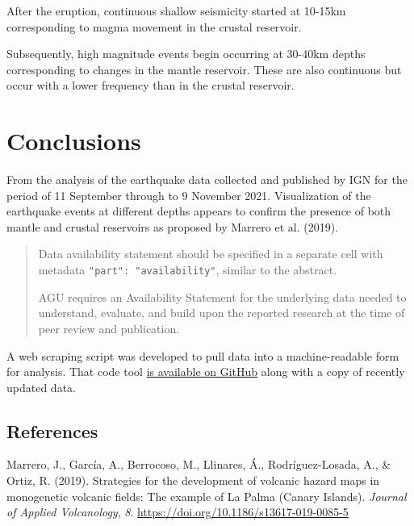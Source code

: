 \documentclass[
]{agujournal2019}
\newlength{\cslentryspacing}
\begin{document}
After the eruption, continuous shallow seismicity started at 10-15km
corresponding to magma movement in the crustal reservoir.

Subsequently, high magnitude events begin occurring at 30-40km depths
corresponding to changes in the mantle reservoir. These are also
continuous but occur with a lower frequency than in the crustal
reservoir.

\section{Conclusions}\label{conclusions}

From the analysis of the earthquake data collected and published by IGN
for the period of 11 September through to 9 November 2021. Visualization
of the earthquake events at different depths appears to confirm the
presence of both mantle and crustal reservoirs as proposed by Marrero et
al. (2019).

\begin{quote}
Data availability statement should be specified in a separate cell with
metadata \texttt{"part":\ "availability"}, similar to the abstract.

AGU requires an Availability Statement for the underlying data needed to
understand, evaluate, and build upon the reported research at the time
of peer review and publication.
\end{quote}

A web scraping script was developed to pull data into a machine-readable
form for analysis. That code tool
\href{https://github.com/stevejpurves/ign-earthquake-data}{is available
on GitHub} along with a copy of recently updated data.

\subsection*{References}\label{references}

\label{refs}
\setlength{\cslentryspacing}{0em}
\begin{CSLReferences}
\vspace{1em}

Marrero, J., García, A., Berrocoso, M., Llinares, Á., Rodríguez-Losada,
A., \& Ortiz, R. (2019). Strategies for the development of volcanic
hazard maps in monogenetic volcanic fields: The example of {La} {Palma}
({Canary} {Islands}). \emph{Journal of Applied Volcanology}, \emph{8}.
\url{https://doi.org/10.1186/s13617-019-0085-5}

\end{CSLReferences}
\end{document}
